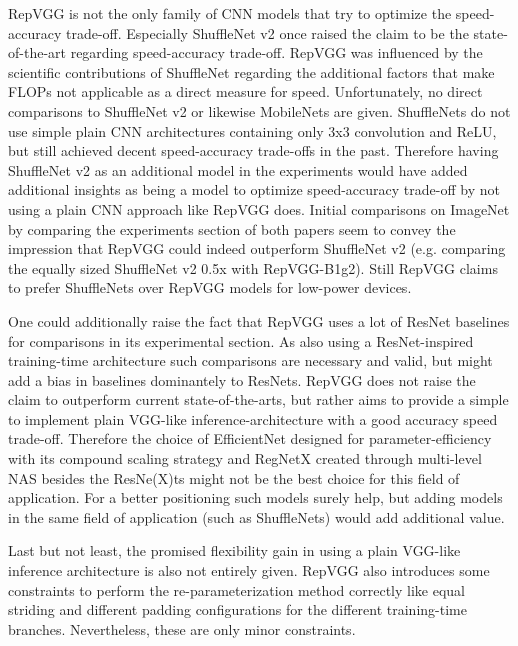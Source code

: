 RepVGG is not the only family of CNN models that try to optimize the speed-accuracy trade-off. Especially ShuffleNet v2 once raised the claim to be the state-of-the-art regarding speed-accuracy trade-off. RepVGG was influenced by the scientific contributions of ShuffleNet regarding the additional factors that make FLOPs not applicable as a direct measure for speed. Unfortunately, no direct comparisons to ShuffleNet v2 or likewise MobileNets are given. ShuffleNets do not use simple plain CNN architectures containing only 3x3 convolution and ReLU, but still achieved decent speed-accuracy trade-offs in the past. Therefore having ShuffleNet v2 as an additional model in the experiments would have added additional insights as being a model to optimize speed-accuracy trade-off by not using a plain CNN approach like RepVGG does. Initial comparisons on ImageNet by comparing the experiments section of both papers seem to convey the impression that RepVGG could indeed outperform ShuffleNet v2 (e.g. comparing the equally sized ShuffleNet v2 0.5x with RepVGG-B1g2). Still RepVGG claims to prefer ShuffleNets over RepVGG models for low-power devices. 

One could additionally raise the fact that RepVGG uses a lot of ResNet baselines for comparisons in its experimental section. As also using a ResNet-inspired training-time architecture such comparisons are necessary and valid, but might add a bias in baselines dominantely to ResNets. RepVGG does not raise the claim to outperform current state-of-the-arts, but rather aims to provide a simple to implement plain VGG-like inference-architecture with a good accuracy speed trade-off. Therefore the choice of EfficientNet designed for parameter-efficiency with its compound scaling strategy and RegNetX created through multi-level NAS besides the ResNe(X)ts might not be the best choice for this field of application. For a better positioning such models surely help, but adding models in the same field of application (such as ShuffleNets) would add additional value.

Last but not least, the promised flexibility gain in using a plain VGG-like inference architecture is also not entirely given. RepVGG also introduces some constraints to perform the re-parameterization method correctly like equal striding and different padding configurations for the different training-time branches. Nevertheless, these are only minor constraints. 
